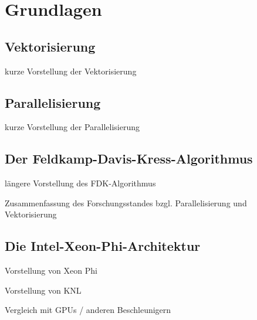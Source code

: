 \chapter{Grundlagen}

\section{Vektorisierung}

kurze Vorstellung der Vektorisierung

\section{Parallelisierung}

kurze Vorstellung der Parallelisierung

\section{Der Feldkamp-Davis-Kress-Algorithmus}

längere Vorstellung des FDK-Algorithmus

Zusammenfassung des Forschungsstandes bzgl. Parallelisierung und Vektorisierung

\section{Die Intel{\textregistered}-Xeon-Phi{\texttrademark}-Architektur}

Vorstellung von Xeon Phi

Vorstellung von KNL

Vergleich mit GPUs / anderen Beschleunigern

